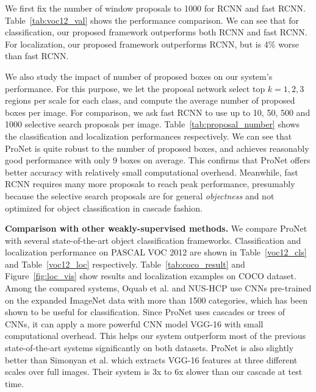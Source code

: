 \documentclass[10pt,twocolumn,letterpaper]{article}
\begin{document}
We first fix the number of window proposals to 1000 for RCNN and fast RCNN. Table~\ref{tab:voc12_val} shows the performance comparison. We can see that for classification, our proposed framework outperforms both RCNN and fast RCNN. For localization, our proposed framework outperforms RCNN, but is 4\% worse than fast RCNN. 

We also study the impact of number of proposed boxes on our system's performance. For this purpose, we let the proposal network select top $k=1,2,3$ regions per scale for each class, and compute the average number of proposed boxes per image. For comparison, we ask fast RCNN to use up to 10, 50, 500 and 1000 selective search proposals per image. Table~\ref{tab:proposal_number} shows the classification and localization performances respectively. We can see that ProNet is quite robust to the number of proposed boxes, and achieves reasonably good performance with only 9 boxes on average. This confirms that ProNet offers better accuracy with relatively small computational overhead. Meanwhile, fast RCNN requires many more proposals to reach peak performance, presumably because the selective search proposals are for general \textit{objectness} and not optimized for object classification in cascade fashion.

\textbf{Comparison with other weakly-supervised methods.} We compare ProNet with several state-of-the-art object classification frameworks. Classification and localization performance on PASCAL VOC 2012 are shown in Table~\ref{voc12_cls} and Table~\ref{voc12_loc} respectively. Table~\ref{tab:coco_result} and Figure~\ref{fig:loc_vis} show results and localization examples on COCO dataset. Among the compared systems, Oquab et al. and NUS-HCP use CNNs pre-trained on the expanded ImageNet data with more than 1500 categories, which has been shown to be useful for classification. Since ProNet uses cascades or trees of CNNs, it can apply a more powerful CNN model VGG-16 with small computational overhead. This helps our system outperform most of the previous state-of-the-art systems significantly on both datasets. ProNet is also slightly better than Simonyan et al. which extracts VGG-16 features at three different scales over full images. Their system is 3x to 6x slower than our cascade at test time.

\end{document}
